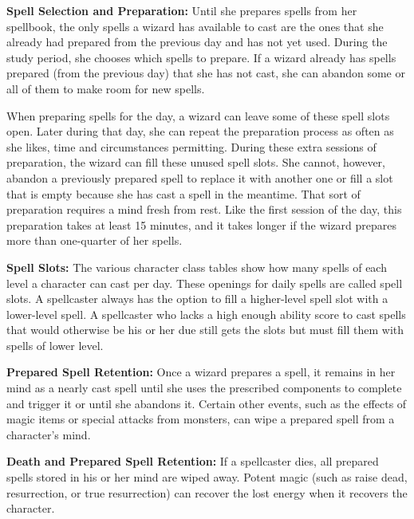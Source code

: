 \textbf{Spell Selection and Preparation:} Until she prepares spells from her spellbook, the only spells a wizard has available to cast are the ones that she already had prepared from the previous day and has not yet used. During the study period, she chooses which spells to prepare. If a wizard already has spells prepared (from the previous day) that she has not cast, she can abandon some or all of them to make room for new spells.

When preparing spells for the day, a wizard can leave some of these spell slots open. Later during that day, she can repeat the preparation process as often as she likes, time and circumstances permitting. During these extra sessions of preparation, the wizard can fill these unused spell slots. She cannot, however, abandon a previously prepared spell to replace it with another one or fill a slot that is empty because she has cast a spell in the meantime. That sort of preparation requires a mind fresh from rest. Like the first session of the day, this preparation takes at least 15 minutes, and it takes longer if the wizard prepares more than one-quarter of her spells.

\textbf{Spell Slots:} The various character class tables show how many spells of each level a character can cast per day. These openings for daily spells are called spell slots. A spellcaster always has the option to fill a higher-level spell slot with a lower-level spell. A spellcaster who lacks a high enough ability score to cast spells that would otherwise be his or her due still gets the slots but must fill them with spells of lower level.

\textbf{Prepared Spell Retention:} Once a wizard prepares a spell, it remains in her mind as a nearly cast spell until she uses the prescribed components to complete and trigger it or until she abandons it. Certain other events, such as the effects of magic items or special attacks from monsters, can wipe a prepared spell from a character's mind.

\textbf{Death and Prepared Spell Retention:} If a spellcaster dies, all prepared spells stored in his or her mind are wiped away. Potent magic (such as raise dead, resurrection, or true resurrection) can recover the lost energy when it recovers the character.